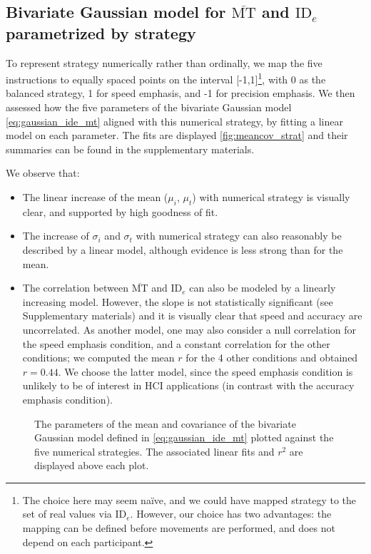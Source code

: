 \documentclass[manuscript,review,anonymous]{acmart}
\newcommand{\mmt}{\ensuremath{\overline{\text{MT}}}\xspace}
\newcommand{\ide}{\ensuremath{{\text{ID}_e}}\xspace}
\begin{document}
\subsection{Bivariate Gaussian model for \mmt and \ide parametrized by strategy}
To represent strategy numerically rather than ordinally, we map the five instructions to equally spaced points on the interval [-1,1]\footnote{The choice here may seem naïve, and we could have mapped strategy to the set of real values via \ide. However, our choice has two advantages: the mapping can be defined before movements are performed, and does not depend on each participant.}, with 0 as the balanced strategy, 1 for speed emphasis, and -1 for precision emphasis. We then assessed how the five parameters of the bivariate Gaussian model \autoref{eq:gaussian_ide_mt} aligned with this numerical strategy, by fitting a linear model on each parameter. The fits are displayed \autoref{fig:meancov_strat} and their summaries can be found in the supplementary materials.


\noindent We observe that:
\begin{itemize}
	\item The linear increase of the mean ($\mu_i$, $\mu_t$) with numerical strategy is visually clear, and supported by high goodness of fit.
	\item The increase of $\sigma_i$ and $\sigma_t$ with numerical strategy can also reasonably be described by a linear model, although evidence is less strong than for the mean.
	\item The correlation between \mmt and \ide can also be modeled by a linearly increasing model. However, the slope is not statistically significant (see Supplementary materials) and it is visually clear that speed and accuracy are uncorrelated. As another model, one may also consider a null correlation for the speed emphasis condition, and a constant correlation for the other conditions; we computed the mean $r$ for the 4 other conditions and obtained $r=0.44$. We choose the latter model, since the speed emphasis condition is unlikely to be of interest in HCI applications (in contrast with the accuracy emphasis condition).
\end{itemize}


\begin{figure}[htbp]
	\centering
	\caption{The parameters of the mean and covariance of the bivariate Gaussian model defined in \autoref{eq:gaussian_ide_mt} plotted against the five numerical strategies. The associated linear fits and $r^2$ are displayed above each plot.}
	\label{fig:meancov_strat}

\end{figure}
\end{document}
